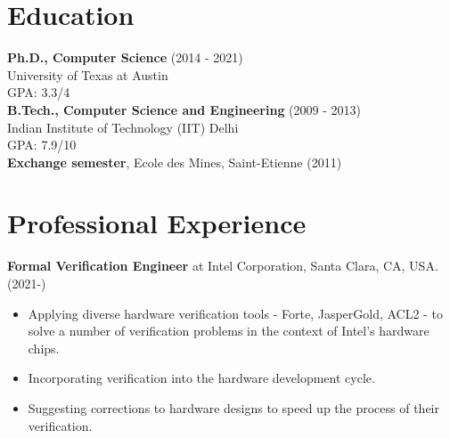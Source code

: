 \documentclass[margin]{res}
\begin{document}

\address{Department of Computer Science \\University of Texas at Austin }

\address{+1 512-952-0104 \\ \url{www.cs.utexas.edu/~mihir} }


\begin{resume}


\section{Education}
{\bf Ph.D., Computer Science} \hfill (2014 - 2021)\\
University of Texas at Austin\\
GPA: 3.3/4\\
{\bf B.Tech., Computer Science and Engineering} \hfill (2009 - 2013)\\
Indian Institute of Technology (IIT) Delhi\\
GPA: 7.9/10\\
{\bf Exchange semester}, Ecole des Mines, Saint-Etienne \hfill (2011)

\section{Professional Experience}

 {\bf Formal Verification Engineer} at Intel Corporation, Santa Clara,
 CA, USA. \hfill (2021-)
 \begin{itemize} \itemsep -2pt  %
 \item Applying diverse hardware verification tools - Forte,
   JasperGold, ACL2 - to solve a number of verification problems in
   the context of Intel's hardware chips.
 \item Incorporating verification into the hardware development cycle.
 \item Suggesting corrections to hardware designs to speed up the
   process of their verification.
 \end{itemize}


\end{resume}
\end{document}
